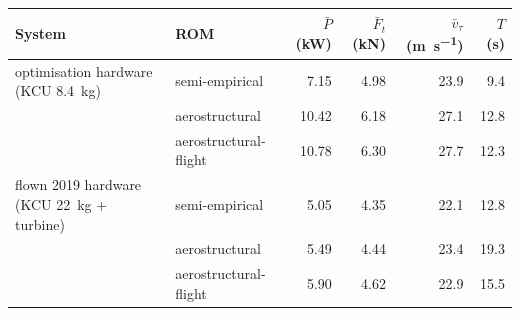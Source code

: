 \begin{tabular}{llrrrr}
\toprule
System & ROM & $\bar P$ (\si{\kilo\watt}) & $\bar F_t$ (\si{\kilo\newton}) & $\bar v_\tau$ (\si{\metre\per\second}) & $T$ (\si{\second}) \\
\midrule
optimisation hardware (KCU \SI{8.4}{\kilogram}) & semi-empirical & 7.15 & 4.98 & 23.9 & 9.4 \\
 & aerostructural & 10.42 & 6.18 & 27.1 & 12.8 \\
 & aerostructural-flight & 10.78 & 6.30 & 27.7 & 12.3 \\
\midrule
flown 2019 hardware (KCU \SI{22}{\kilogram} + turbine) & semi-empirical & 5.05 & 4.35 & 22.1 & 12.8 \\
 & aerostructural & 5.49 & 4.44 & 23.4 & 19.3 \\
 & aerostructural-flight & 5.90 & 4.62 & 22.9 & 15.5 \\
\bottomrule
\end{tabular}
